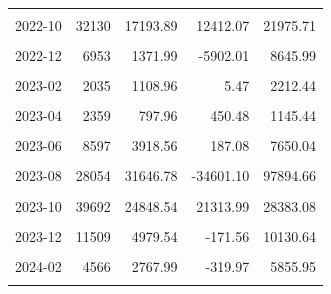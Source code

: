 \begin{longtable}[t]{crrrr}
\cellcolor{gray!10}{2022-09} & \cellcolor{gray!10}{60313} & \cellcolor{gray!10}{32970.62} & \cellcolor{gray!10}{6819.93} & \cellcolor{gray!10}{59121.31}\\
2022-10 & 32130 & 17193.89 & 12412.07 & 21975.71\\
\cellcolor{gray!10}{2022-11} & \cellcolor{gray!10}{16978} & \cellcolor{gray!10}{7420.69} & \cellcolor{gray!10}{-17230.98} & \cellcolor{gray!10}{32072.36}\\
2022-12 & 6953 & 1371.99 & -5902.01 & 8645.99\\
\cellcolor{gray!10}{2023-01} & \cellcolor{gray!10}{2494} & \cellcolor{gray!10}{759.61} & \cellcolor{gray!10}{-801.62} & \cellcolor{gray!10}{2320.85}\\
2023-02 & 2035 & 1108.96 & 5.47 & 2212.44\\
\cellcolor{gray!10}{2023-03} & \cellcolor{gray!10}{2585} & \cellcolor{gray!10}{1238.15} & \cellcolor{gray!10}{622.72} & \cellcolor{gray!10}{1853.58}\\
2023-04 & 2359 & 797.96 & 450.48 & 1145.44\\
\cellcolor{gray!10}{2023-05} & \cellcolor{gray!10}{5286} & \cellcolor{gray!10}{2796.79} & \cellcolor{gray!10}{2231.66} & \cellcolor{gray!10}{3361.91}\\
2023-06 & 8597 & 3918.56 & 187.08 & 7650.04\\
\cellcolor{gray!10}{2023-07} & \cellcolor{gray!10}{13985} & \cellcolor{gray!10}{5528.12} & \cellcolor{gray!10}{-927.92} & \cellcolor{gray!10}{11984.17}\\
2023-08 & 28054 & 31646.78 & -34601.10 & 97894.66\\
\cellcolor{gray!10}{2023-09} & \cellcolor{gray!10}{46486} & \cellcolor{gray!10}{24109.95} & \cellcolor{gray!10}{-10494.64} & \cellcolor{gray!10}{58714.53}\\
2023-10 & 39692 & 24848.54 & 21313.99 & 28383.08\\
\cellcolor{gray!10}{2023-11} & \cellcolor{gray!10}{26819} & \cellcolor{gray!10}{15989.27} & \cellcolor{gray!10}{2408.50} & \cellcolor{gray!10}{29570.03}\\
2023-12 & 11509 & 4979.54 & -171.56 & 10130.64\\
\cellcolor{gray!10}{2024-01} & \cellcolor{gray!10}{4555} & \cellcolor{gray!10}{2178.08} & \cellcolor{gray!10}{1413.16} & \cellcolor{gray!10}{2942.99}\\
2024-02 & 4566 & 2767.99 & -319.97 & 5855.95\\
\cellcolor{gray!10}{2024-03} & \cellcolor{gray!10}{5448} & \cellcolor{gray!10}{6116.19} & \cellcolor{gray!10}{3399.73} & \cellcolor{gray!10}{8832.65}\\

\end{longtable}
